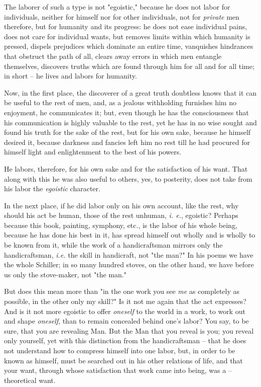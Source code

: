 \documentclass[a4paper]{book}
\begin{document}
The laborer of such a type is not "{}egoistic,"{} because he does not labor 
for individuals, neither for himself nor for other individuals, not for 
\textit{private} men therefore, but for humanity and its progress: he does not 
ease individual pains, does not care for individual wants, but removes limits 
within which humanity is pressed, dispels prejudices which dominate an entire 
time, vanquishes hindrances that obstruct the path of all, clears away errors 
in which men entangle themselves, discovers truths which are found through him 
for all and for all time; in short -- he lives and labors for humanity.

Now, in the first place, the discoverer of a great truth doubtless knows that 
it can be useful to the rest of men, and, as a jealous withholding furnishes 
him no enjoyment, he communicates it; but, even though he has the 
consciousness that his communication is highly valuable to the rest, yet he 
has in no wise sought and found his truth for the sake of the rest, but for 
his own sake, because he himself desired it, because darkness and fancies left 
him no rest till he had procured for himself light and enlightenment to the 
best of his powers.

He labors, therefore, for his own sake and for the satisfaction of his want. 
That along with this he was also useful to others, yes, to posterity, does not 
take from his labor the \textit{egoistic} character.

In the next place, if he did labor only on his own account, like the rest, why 
should his act be human, those of the rest unhuman, \textit{i. e.}, egoistic? 
Perhaps because this book, painting, symphony, etc., is the labor of his whole 
being, because he has done his best in it, has spread himself out wholly and 
is wholly to be known from it, while the work of a handicraftsman mirrors only 
the handicraftsman, \textit{i.e.} the skill in handicraft, not "{}the man?"{} 
In his poems we have the whole Schiller; in so many hundred stoves, on the 
other hand, we have before us only the stove-maker, not "{}the man."{}

But does this mean more than "{}in the one work you see \textit{me} as 
completely as possible, in the other only my skill?"{} Is it not me again that 
the act expresses? And is it not more egoistic to offer \textit{oneself} to 
the world in a work, to work out and shape \textit{oneself}, than to remain 
concealed behind one's labor? You say, to be sure, that you are revealing Man. 
But the Man that you reveal is you; you reveal only yourself, yet with this 
distinction from the handicraftsman -- that he does not understand how to 
compress himself into one labor, but, in order to be known as himself, must be 
searched out in his other relations of life, and that your want, through whose 
satisfaction that work came into being, was a -- theoretical want.
\end{document}

